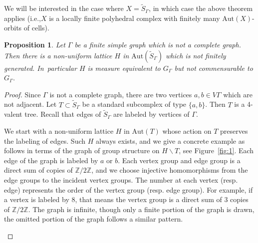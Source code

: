 \documentclass[11pt]{article}
\newcommand{\ie}{i.e.,\xspace}
\newcommand{\resp}{resp.\xspace}
\newcommand{\smaller}{\small}
\numberwithin{equation}{section}
\theoremstyle{plain}
\newtheorem{prop}[theo]{Proposition}
\theoremstyle{definition}
\newcommand{\Aut}{\mathrm{Aut}}
\begin{document}
We will be interested in the case where $X=\widetilde S_\Gamma$, in which case the above theorem applies (\ie $X$ is a locally finite polyhedral complex with finitely many $\Aut(X)$-orbits of cells).\enlargethispage{\baselineskip}%

\begin{prop}\label{prop:lattice}
Let $\Gamma$ be a finite simple graph which is not a complete graph. Then there is a non-uniform lattice $H$ in $\Aut(\widetilde S_\Gamma)$ which is not finitely generated. In~particular $H$ is measure equivalent to $G_\Gamma$ but not commensurable to $G_\Gamma$.
\end{prop}

\begin{proof}
Since $\Gamma$ is not a complete graph, there are two vertices $a,b\in V\Gamma$ which are not adjacent. Let $T\subset \widetilde S_\Gamma$ be a standard subcomplex of type $\{a,b\}$. Then $T$ is a 4-valent tree. Recall that edges of $\widetilde S_\Gamma$ are labeled by vertices of $\Gamma$.

We start with a non-uniform lattice $H$ in $\Aut(T)$ whose action on $T$ preserves the labeling of edges. Such $H$ always exists, and we give a concrete example as follows in terms of the graph of group structure on $H\backslash T$, see Figure~\ref{fig:1}. Each edge of the graph is labeled by $a$ or $b$. Each vertex group and edge group is a direct sum of copies of $\mathbb Z/2\mathbb Z$, and we choose injective homomorphisms from the edge groups to the incident vertex groups. The number at each vertex (\resp edge) represents the order of the vertex group (\resp edge group). For example, if a vertex is labeled by $8$, that means the vertex group is a direct sum of 3 copies of $\mathbb Z/2\mathbb Z$. The graph is infinite, though only a finite portion of the graph is drawn, the omitted portion of the graph follows a similar pattern.
\begin{figure}
\smaller\smaller
{}
\end{figure}
\end{proof}
\end{document}
